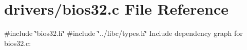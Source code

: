 \hypertarget{a00020}{}\section{drivers/bios32.c File Reference}
\label{a00020}
{\ttfamily \#include \char`\"{}bios32.\+h\char`\"{}}\newline
{\ttfamily \#include \char`\"{}../libc/types.\+h\char`\"{}}\newline
Include dependency graph for bios32.\+c\+:
